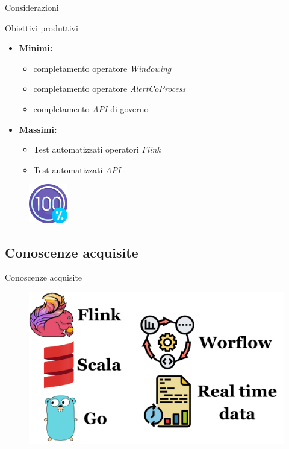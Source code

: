 \documentclass{beamer}
\begin{document}
	\begin{frame}{Considerazioni}
		\begin{block}{Obiettivi produttivi}
			\begin{itemize}
				\item \textbf{Minimi:} 
					\begin{itemize}
						\item completamento operatore \textit{Windowing} \vspace{.5em}
						\item completamento operatore \textit{AlertCoProcess} \vspace{.5em}
						\item completamento \textit{API} di governo \vspace{.5em}
					\end{itemize}
				\item \textbf{Massimi:}
					\begin{itemize}
						\item Test automatizzati operatori \textit{Flink} \vspace{.5em}
						\item Test automatizzati \textit{API} \vspace{.5em}
					\end{itemize}
			\end{itemize}
		\end{block}
		
		\begin{figure}[!h]
    		 \centering
    		\includegraphics[width=1.7cm]{../immagini/slide/100-percent.png}
		\end{figure}
	\end{frame}
	
	\subsection{Conoscenze acquisite}

	\begin{frame}{Conoscenze acquisite}
		\begin{figure}[!h]
    		 \centering
    		\includegraphics[width=1\columnwidth]{../immagini/slide/learned.pdf}
		\end{figure}
	\end{frame}
\end{document}
